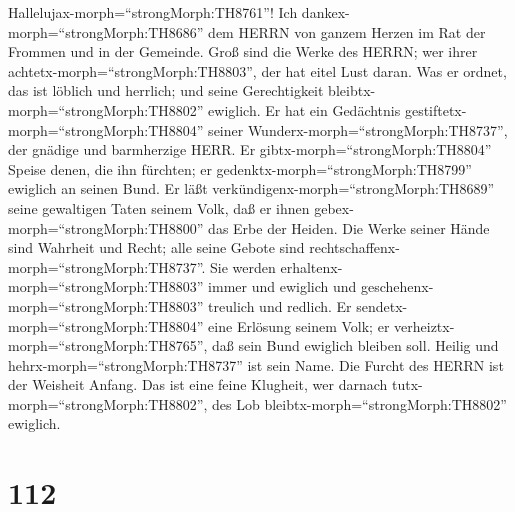  Hallelujax-morph=``strongMorph:TH8761''! Ich
dankex-morph=``strongMorph:TH8686'' dem HERRN von ganzem Herzen im Rat
der Frommen und in der Gemeinde.  Groß sind die Werke des
HERRN; wer ihrer achtetx-morph=``strongMorph:TH8803'', der hat eitel
Lust daran.  Was er ordnet, das ist löblich und herrlich;
und seine Gerechtigkeit bleibtx-morph=``strongMorph:TH8802'' ewiglich.
 Er hat ein Gedächtnis
gestiftetx-morph=``strongMorph:TH8804'' seiner
Wunderx-morph=``strongMorph:TH8737'', der gnädige und barmherzige HERR.
 Er gibtx-morph=``strongMorph:TH8804'' Speise denen, die ihn
fürchten; er gedenktx-morph=``strongMorph:TH8799'' ewiglich an seinen
Bund.  Er läßt verkündigenx-morph=``strongMorph:TH8689''
seine gewaltigen Taten seinem Volk, daß er ihnen
gebex-morph=``strongMorph:TH8800'' das Erbe der Heiden.  Die
Werke seiner Hände sind Wahrheit und Recht; alle seine Gebote sind
rechtschaffenx-morph=``strongMorph:TH8737''.  Sie werden
erhaltenx-morph=``strongMorph:TH8803'' immer und ewiglich und
geschehenx-morph=``strongMorph:TH8803'' treulich und redlich.
 Er sendetx-morph=``strongMorph:TH8804'' eine Erlösung
seinem Volk; er verheiztx-morph=``strongMorph:TH8765'', daß sein Bund
ewiglich bleiben soll. Heilig und hehrx-morph=``strongMorph:TH8737'' ist
sein Name.  Die Furcht des HERRN ist der Weisheit Anfang.
Das ist eine feine Klugheit, wer darnach
tutx-morph=``strongMorph:TH8802'', des Lob
bleibtx-morph=``strongMorph:TH8802'' ewiglich.

\hypertarget{section-111}{%
\section{112}\label{section-111}}

